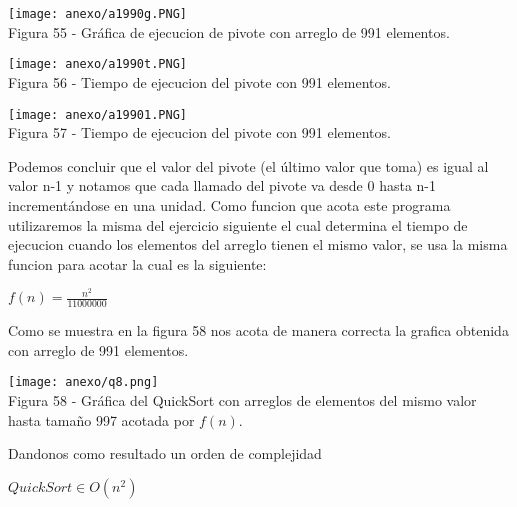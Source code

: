 \documentclass[12pt,twoside]{article}
\begin{document}
\begin{center}
    \texttt{[image: anexo/a1990g.PNG]}\\
    Figura 55 - Gráfica de ejecucion de pivote con arreglo de 991 elementos.
\end{center}
\begin{center}
    \texttt{[image: anexo/a1990t.PNG]}\\
    Figura 56 - Tiempo de ejecucion del pivote con 991 elementos.
\end{center}
\begin{center}
    \texttt{[image: anexo/a19901.PNG]}\\
    Figura 57 - Tiempo de ejecucion del pivote con 991 elementos.
\end{center}
Podemos concluir que el valor del pivote (el \'ultimo valor que toma) es igual al valor n-1 y notamos que cada llamado del pivote va desde 0 hasta n-1 increment\'andose en una unidad.
Como funcion que acota este programa utilizaremos la misma del ejercicio siguiente el cual determina el tiempo de ejecucion cuando los elementos del arreglo tienen el mismo valor, se usa la misma funcion para acotar la cual es la siguiente:
\begin{center}
    $f(n) = \frac{n^2}{11000000}$
\end{center}
Como se muestra en la figura 58 nos acota de manera correcta la grafica obtenida con arreglo de 991 elementos.
\begin{center}
    \texttt{[image: anexo/q8.png]}\\
    Figura 58 - Gráfica del QuickSort con arreglos de elementos del mismo valor hasta tamaño 997 acotada por $f(n)$.
\end{center}
Dandonos como resultado un orden de complejidad \begin{center}
    $QuickSort \in O(n^2)$
\end{center}
\end{document}
